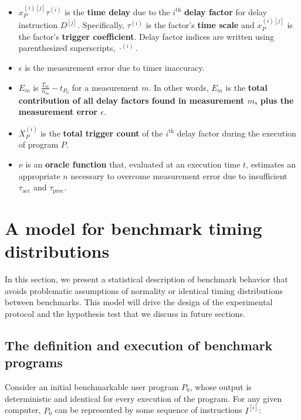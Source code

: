 \documentclass[conference]{IEEEtran}
\begin{document}
\begin{itemize}
    \item
    $x_P^{(i)[j]} \tau^{(i)}$ is the \textbf{time delay} due to the
    $i^{\textrm{th}}$ \textbf{delay factor} for delay instruction $D^{[j]}$.  Specifically,
    $\tau^{(i)}$ is the factor's \textbf{time scale} and $x_P^{(i)[j]}$ is the factor's
    \textbf{trigger coefficient}. Delay factor indices are written using parenthesized
    superscripts, $\cdot^{(i)}$.

    \item
    $\epsilon$ is the measurement error due to timer inaccuracy.

    \item
    $E_m$ is $\frac{T_m}{n_m} - t_{P_0}$ for a measurement $m$. In other words, $E_m$ is the
    \textbf{total contribution of all delay factors found in measurement $m$, plus the
    measurement error $\epsilon$}.

    \item
    $X^{(i)}_P$ is the \textbf{total trigger count} of the $i^{\textrm{th}}$
    delay factor during the execution of program $P$.

    \item
    $\nu$ is an \textbf{oracle function} that, evaluated at an execution time $t$, estimates
    an appropriate $n$ necessary to overcome measurement error due to insufficient
    $\tau_{\textrm{acc}}$ and $\tau_{\textrm{prec}}$.
\end{itemize}

\section{A model for benchmark timing distributions}
\label{sec:model}

In this section, we present a statistical description of benchmark behavior that avoids
problematic assumptions of normality or identical timing distributions between benchmarks.
This model will drive the design of the experimental protocol and the hypothesis test
that we discuss in future sections.

\subsection{The definition and execution of benchmark programs}
\label{sec:programmodel}

Consider an initial benchmarkable user program $P_0$, whose output is deterministic and
identical for every execution of the program. For any given computer, $P_0$ can be
represented by some sequence of instructions $I^{[i]}$:
\end{document}
